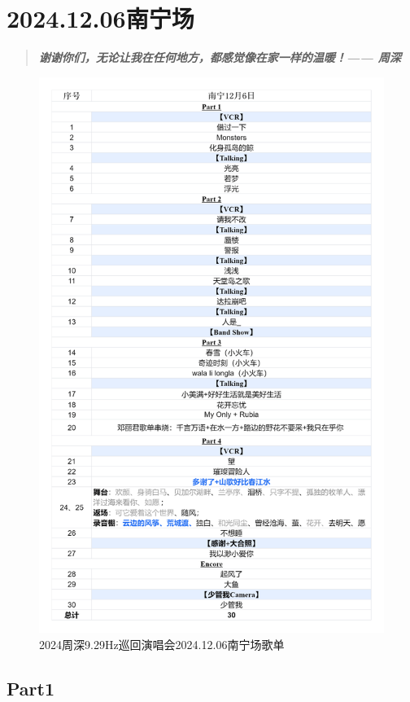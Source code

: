 \documentclass[]{ctexbook}
\begin{document}
\chapter{2024.12.06南宁场}\label{nanning-20241206}

\begin{quote}
\textbf{\emph{谢谢你们，无论让我在任何地方，都感觉像在家一样的温暖！------ 周深}}
\end{quote}

\begin{figure}

{\centering \includegraphics[width=320pt]{img/playlists/playlists-nanning-20241206} 

}

\caption{2024周深9.29Hz巡回演唱会2024.12.06南宁场歌单}\label{fig:unnamed-chunk-128}
\end{figure}

\newpage

\section{Part1}\label{nanning-20241206-part1}
\end{document}
